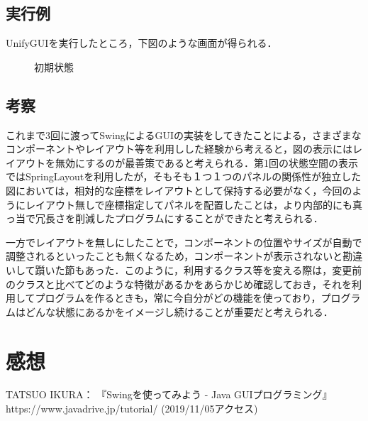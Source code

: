 \documentclass[12pt]{jarticle}
\begin{document}
\clearpage

\subsection{実行例}
UnifyGUIを実行したところ，下図のような画面が得られる．

\begin{figure}[!hbt]
  	\begin{center}
	\end{center}
  	\caption{初期状態}
\end{figure}
\clearpage


\subsection{考察}
これまで3回に渡ってSwingによるGUIの実装をしてきたことによる，さまざまなコンポーネントやレイアウト等を利用しした経験から考えると，図の表示にはレイアウトを無効にするのが最善策であると考えられる．第1回の状態空間の表示ではSpringLayoutを利用したが，そもそも１つ１つのパネルの関係性が独立した図においては，相対的な座標をレイアウトとして保持する必要がなく，今回のようにレイアウト無しで座標指定してパネルを配置したことは，より内部的にも真っ当で冗長さを削減したプログラムにすることができたと考えられる．

一方でレイアウトを無しにしたことで，コンポーネントの位置やサイズが自動で調整されるといったことも無くなるため，コンポーネントが表示されないと勘違いして躓いた節もあった．このように，利用するクラス等を変える際は，変更前のクラスと比べてどのような特徴があるかをあらかじめ確認しておき，それを利用してプログラムを作るときも，常に今自分がどの機能を使っており，プログラムはどんな状態にあるかをイメージし続けることが重要だと考えられる．


\section{感想}


\begin{thebibliography}{99}
TATSUO IKURA： 『Swingを使ってみよう - Java GUIプログラミング』 https://www.javadrive.jp/tutorial/ (2019/11/05アクセス) \\
\end{thebibliography}
\end{document}
